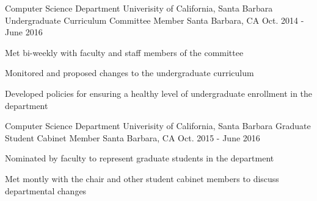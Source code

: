 \begin{cventries}
  \cventry
    {Computer Science Department \newline Univerisity of California, Santa Barbara}
    {Undergraduate Curriculum Committee Member}
    {Santa Barbara, CA}
    {Oct. 2014 - June 2016}
    {
      \begin{cvitems}
	\item{Met bi-weekly with faculty and staff members of the committee}
        \item {Monitored and proposed changes to the undergraduate curriculum}
        \item {Developed policies for ensuring a healthy level of undergraduate enrollment in the department}
      \end{cvitems}
    }


\cventry
    {Computer Science Department \newline Univerisity of California, Santa Barbara}
    {Graduate Student Cabinet Member}
    {Santa Barbara, CA}
    {Oct. 2015 - June 2016}
    {
      \begin{cvitems}
	\item{Nominated by faculty to represent graduate students in the department}
        \item {Met montly with the chair and other student cabinet members to discuss departmental changes}
      \end{cvitems}
    }

  \end{cventries}
